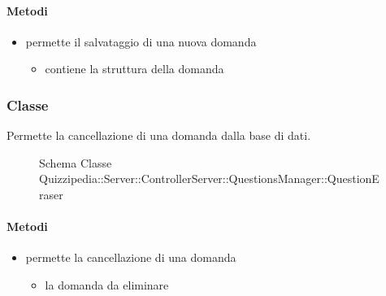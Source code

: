 \paragraph{Metodi}
\begin{itemize}
\item {}
\newline
permette il salvataggio di una nuova domanda
\newline
{}
\newline
\begin{itemize}
\item {}
\newline
contiene la struttura della domanda
\end{itemize}
\end{itemize}
\subsubsection{Classe }
Permette la cancellazione di una domanda dalla base di dati.
\begin{figure}[H]
\centering
\noindent{}
\caption[Schema Classe QuestionEraser]{Schema Classe Quizzipedia::Server::ControllerServer::QuestionsManager::QuestionEraser}
\end{figure}
\paragraph{Metodi}
\begin{itemize}
\item {}
\newline
permette la cancellazione di una domanda
\newline
{}
\newline
\begin{itemize}
\item {}
\newline
la domanda da eliminare
\end{itemize}
\end{itemize}
